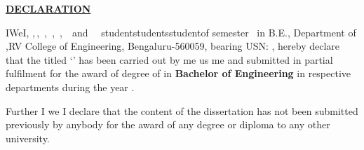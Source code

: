 
\thispagestyle{empty}
\vspace{-0.75cm}
\begin{center}
	\Large\textbf{\underline{DECLARATION}} \par
\end{center}


\noindent \ifPG I\else \ifStuNameBUsed We\else I\fi\fi, \textbf{\printStuNameA}\ifPG ,$\,$\else\ifStuNameBUsed\ifStuNameCUsed,$\,$ \fi \textbf{\printStuNameB}\ifStuNameCUsed \ifStuNameDUsed,$\,$ \fi \textbf{\printStuNameC}\ifStuNameDUsed\ifIDP,$\,$ \fi  \textbf{\printStuNameD}\ifIDP\ifStuNameEUsed\ifStuNameFUsed,$\,$ \fi \textbf{\printStuNameE}$\,$ \ifStuNameFUsed and $\,$ \textbf{\printStuNameF}$\,$ \fi\fi\fi\fi\fi\fi\fi \ifPG student\space \else \ifStuNameBUsed\space students\space\else\space student\space\fi\fi of \ifPG {} \fi\else{}\else{}\else {}\fi\fi\fi\fi\space semester \ifPG \printMastersInSF\, in \printMastersPrgName \else B.E.\fi, \ifIDP \else Department of \printDepartmentLF,\fi\space RV College of Engineering, Bengaluru-560059, bearing USN: \textbf{\printStuUSNA}, hereby declare that the  \else {} \else {}\fi\fi\fi titled `\textbf{\printTitle}' has been carried out by \ifPG me \else \ifStuNameBUsed us \else me \fi\fi and submitted in partial fulfilment for the award of degree of \ifPG \textbf{\printMastersInLF} in \textbf{\printMastersPrgName} \else\textbf{Bachelor of Engineering} in \ifIDP respective departments \else  \textbf{\printDepartmentLF} \fi\fi during the year \printAcadYear.\\ \par

\noindent Further \ifPG I \else\ifStuNameBUsed we \else I \fi \fi declare that the content of the dissertation has not been submitted previously by anybody for the award of any degree or diploma to any other university.\\ \par

